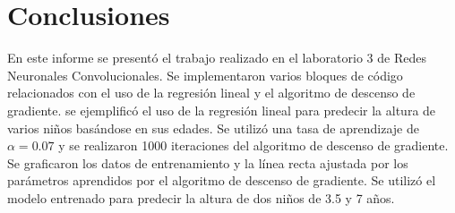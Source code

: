 \documentclass{article}
\begin{document}
\clearpage
\section{Conclusiones}
\noindent
En este informe se presentó el trabajo realizado en el laboratorio 3 de Redes Neuronales Convolucionales.
Se implementaron varios bloques de código relacionados con el uso de la regresión lineal y el algoritmo de descenso de gradiente.
se ejemplificó el uso de la regresión lineal para predecir la altura de varios niños basándose en sus edades.
Se utilizó una tasa de aprendizaje de $\alpha = 0.07$ y se realizaron 1000 iteraciones del algoritmo de descenso de gradiente.
Se graficaron los datos de entrenamiento y la línea recta ajustada por los parámetros aprendidos por el algoritmo de descenso de gradiente.
Se utilizó el modelo entrenado para predecir la altura de dos niños de 3.5 y 7 años.
\end{document}
